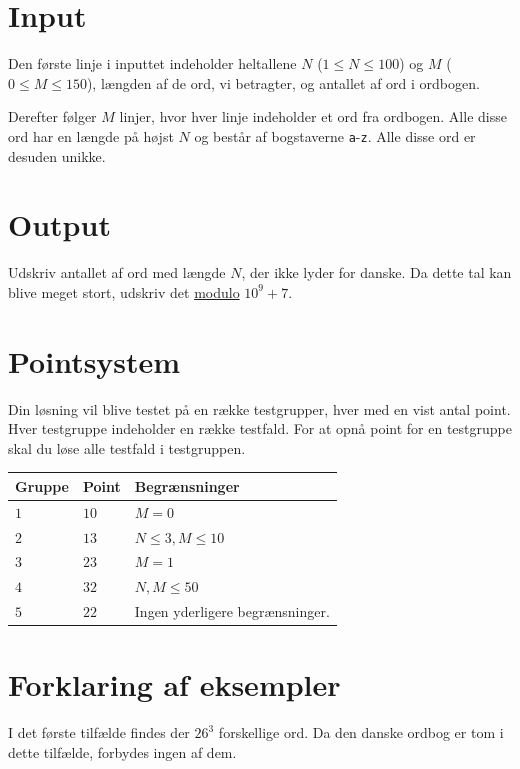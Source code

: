 \section*{Input}
Den første linje i inputtet indeholder heltallene $N$ ($1 \leq N \leq 100$) og $M$ ($0 \leq M \leq 150$), 
længden af de ord, vi betragter, og antallet af ord i ordbogen.

Derefter følger $M$ linjer, hvor hver linje indeholder et ord fra ordbogen. Alle disse ord har en længde på højst $N$ 
og består af bogstaverne \texttt{a}-\texttt{z}. Alle disse ord er desuden unikke.

\section*{Output}
Udskriv antallet af ord med længde $N$, der ikke lyder for danske. Da dette tal kan blive meget stort, 
udskriv det \href{https://en.wikipedia.org/wiki/Modulo}{modulo} $10^9+7$. 

\section*{Pointsystem}
Din løsning vil blive testet på en række testgrupper, hver med en vist antal point. 
Hver testgruppe indeholder en række testfald. For at opnå point for en testgruppe skal du løse alle testfald i testgruppen. 

\noindent
\begin{tabular}{| l | l | p{12cm} |}
  \hline
  \textbf{Gruppe} & \textbf{Point} & \textbf{Begrænsninger} \\ \hline
  $1$    & $10$       & $M = 0$ \\ \hline
  $2$    & $13$       & $N \leq 3, M \leq 10$ \\ \hline
  $3$    & $23$       & $M = 1$ \\ \hline
  $4$    & $32$       & $N, M \leq 50$ \\ \hline
  $5$    & $22$       & Ingen yderligere begrænsninger. \\ \hline
\end{tabular}

\section*{Forklaring af eksempler}
I det første tilfælde findes der $26^3$ forskellige ord. Da den danske ordbog er tom i dette tilfælde, forbydes ingen af dem.
